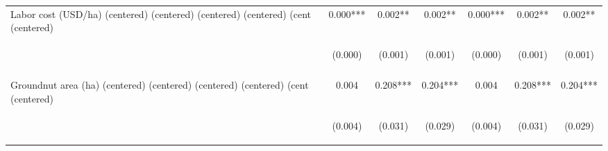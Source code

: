 \begin{center}
\begin{tabular}{lcccccc}
Labor cost (USD/ha) (centered) (centered) (centered) (centered) (cent (centered) & 0.000*** & 0.002** & 0.002** & 0.000*** & 0.002** & 0.002** \\
 & \begin{footnotesize}(0.000)\end{footnotesize} & \begin{footnotesize}(0.001)\end{footnotesize} & \begin{footnotesize}(0.001)\end{footnotesize} & \begin{footnotesize}(0.000)\end{footnotesize} & \begin{footnotesize}(0.001)\end{footnotesize} & \begin{footnotesize}(0.001)\end{footnotesize} \\
\vspace{4pt} & \begin{footnotesize}[0.004]\end{footnotesize} & \begin{footnotesize}[0.011]\end{footnotesize} & \begin{footnotesize}[0.011]\end{footnotesize} & \begin{footnotesize}[0.004]\end{footnotesize} & \begin{footnotesize}[0.011]\end{footnotesize} & \begin{footnotesize}[0.011]\end{footnotesize} \\
Groundnut area (ha) (centered) (centered) (centered) (centered) (cent (centered) & 0.004 & 0.208*** & 0.204*** & 0.004 & 0.208*** & 0.204*** \\
 & \begin{footnotesize}(0.004)\end{footnotesize} & \begin{footnotesize}(0.031)\end{footnotesize} & \begin{footnotesize}(0.029)\end{footnotesize} & \begin{footnotesize}(0.004)\end{footnotesize} & \begin{footnotesize}(0.031)\end{footnotesize} & \begin{footnotesize}(0.029)\end{footnotesize} \\

\end{tabular}
\end{center}
